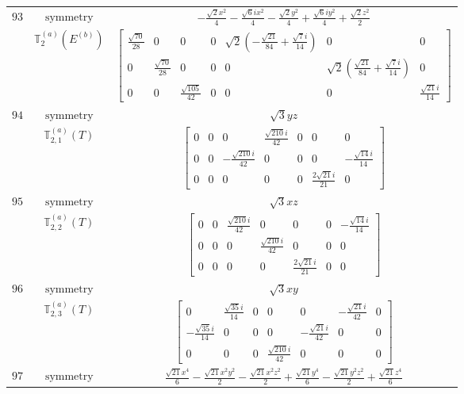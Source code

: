 \documentclass[fleqn,8pt,landscape]{jsarticle}
\begin{document}
\begin{longtable}{ccc}
$ 93 $ & $ \text{symmetry} $ & $ - \frac{\sqrt{2} x^{2}}{4} - \frac{\sqrt{6} i x^{2}}{4} - \frac{\sqrt{2} y^{2}}{4} + \frac{\sqrt{6} i y^{2}}{4} + \frac{\sqrt{2} z^{2}}{2} $ \\
$  $ & $ \mathbb{T}_{2}^{(a)}(E^{(b)}) $ & $ \begin{bmatrix} \frac{\sqrt{70}}{28} & 0 & 0 & 0 & \sqrt{2} \left(- \frac{\sqrt{21}}{84} + \frac{\sqrt{7} i}{14}\right) & 0 & 0 \\ 0 & \frac{\sqrt{70}}{28} & 0 & 0 & 0 & \sqrt{2} \left(\frac{\sqrt{21}}{84} + \frac{\sqrt{7} i}{14}\right) & 0 \\ 0 & 0 & \frac{\sqrt{105}}{42} & 0 & 0 & 0 & \frac{\sqrt{21} i}{14} \end{bmatrix} $ \\ \hline
$ 94 $ & $ \text{symmetry} $ & $ \sqrt{3} y z $ \\
$  $ & $ \mathbb{T}_{2,1}^{(a)}(T) $ & $ \begin{bmatrix} 0 & 0 & 0 & \frac{\sqrt{210} i}{42} & 0 & 0 & 0 \\ 0 & 0 & - \frac{\sqrt{210} i}{42} & 0 & 0 & 0 & - \frac{\sqrt{14} i}{14} \\ 0 & 0 & 0 & 0 & 0 & \frac{2 \sqrt{21} i}{21} & 0 \end{bmatrix} $ \\ \hline
$ 95 $ & $ \text{symmetry} $ & $ \sqrt{3} x z $ \\
$  $ & $ \mathbb{T}_{2,2}^{(a)}(T) $ & $ \begin{bmatrix} 0 & 0 & \frac{\sqrt{210} i}{42} & 0 & 0 & 0 & - \frac{\sqrt{14} i}{14} \\ 0 & 0 & 0 & \frac{\sqrt{210} i}{42} & 0 & 0 & 0 \\ 0 & 0 & 0 & 0 & \frac{2 \sqrt{21} i}{21} & 0 & 0 \end{bmatrix} $ \\ \hline
$ 96 $ & $ \text{symmetry} $ & $ \sqrt{3} x y $ \\
$  $ & $ \mathbb{T}_{2,3}^{(a)}(T) $ & $ \begin{bmatrix} 0 & \frac{\sqrt{35} i}{14} & 0 & 0 & 0 & - \frac{\sqrt{21} i}{42} & 0 \\ - \frac{\sqrt{35} i}{14} & 0 & 0 & 0 & - \frac{\sqrt{21} i}{42} & 0 & 0 \\ 0 & 0 & 0 & \frac{\sqrt{210} i}{42} & 0 & 0 & 0 \end{bmatrix} $ \\ \hline
$ 97 $ & $ \text{symmetry} $ & $ \frac{\sqrt{21} x^{4}}{6} - \frac{\sqrt{21} x^{2} y^{2}}{2} - \frac{\sqrt{21} x^{2} z^{2}}{2} + \frac{\sqrt{21} y^{4}}{6} - \frac{\sqrt{21} y^{2} z^{2}}{2} + \frac{\sqrt{21} z^{4}}{6} $ \\

\end{longtable}
\end{document}
